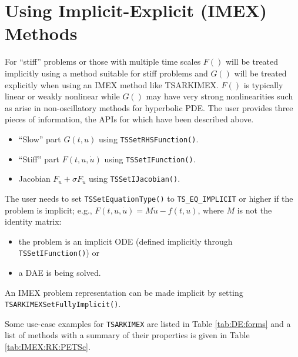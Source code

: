 \section{Using Implicit-Explicit (IMEX) Methods}
\label{sec_imex}
For ``stiff'' problems or those with multiple time scales
$F()$ will be treated implicitly using a method suitable for stiff problems and $G()$ will be treated explicitly when using an IMEX method like TSARKIMEX.
$F()$ is typically linear or weakly nonlinear while $G()$ may have very strong nonlinearities such as arise in non-oscillatory methods for hyperbolic PDE.
The user provides three pieces of information, the APIs for which have been described above.
\begin{itemize}
\item ``Slow'' part $G(t,u)$ using \lstinline{TSSetRHSFunction()}.
\item ``Stiff'' part $F(t,u,\dot u)$ using \lstinline{TSSetIFunction()}.
\item Jacobian $F_u + \sigma F_{\dot u}$ using \lstinline{TSSetIJacobian()}.
\end{itemize}

The user needs to set \lstinline{TSSetEquationType()} to
\lstinline{TS_EQ_IMPLICIT} or higher if the problem is implicit; e.g.,
$F(t,u,\dot u) = M \dot u - f(t,u)$, where $M$ is not the identity matrix:
\begin{itemize}
\item the problem is an implicit ODE (defined implicitly through \lstinline{TSSetIFunction()})
or
\item a DAE is being solved.
\end{itemize}
An IMEX problem representation can be made
implicit by setting \lstinline{TSARKIMEXSetFullyImplicit()}.

Some use-case examples for \lstinline{TSARKIMEX} are listed in Table \ref{tab:DE:forms} and a
list of methods with a summary of their properties is given in
Table \ref{tab:IMEX:RK:PETSc}.

